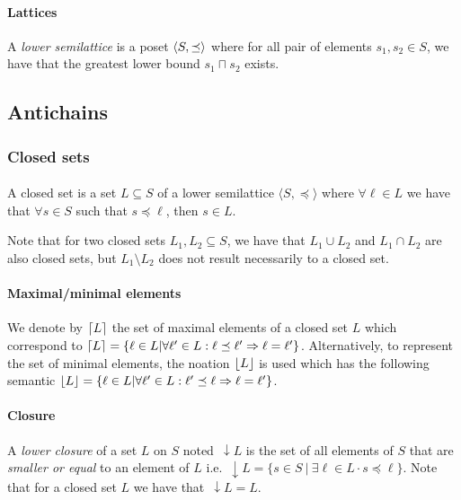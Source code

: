 \documentclass[letterpaper]{article}
\DeclarePairedDelimiter{\ceil}{\lceil}{\rceil}
\DeclarePairedDelimiter{\floor}{\lfloor}{\rfloor}
\DeclarePairedDelimiter{\tuple}{\langle}{\rangle}
\newcommand{\darrow}{\, \downarrow \!\!}
\theoremstyle{definition}
\begin{document}
\paragraph{Lattices} A \textit{lower semilattice} is a poset
$\tuple{S, \preceq}$ where for all pair of elements $s_1, s_2 \in S$,
we have that the greatest lower bound $s_1 \sqcap s_2$ exists.

\subsection{Antichains}

\subsubsection{Closed sets}

\paragraph{}


A closed set is a set $L \subseteq S$
of a lower semilattice $\langle S, \preceq \rangle$
where $\forall \ell \in L$ we have that $\forall s \in S$ such that
$s \preceq \ell$, then $s \in L$.

Note that for two closed sets $L_1, L_2 \subseteq S$, we have that
$L_1 \cup L_2$ and $L_1 \cap L_2$ are also closed sets,
but $L_1 \setminus L_2$ does not result necessarily to a closed set.

\paragraph{Maximal/minimal elements} We denote by $\ceil{L}$
the set of maximal elements of a closed set $L$ which
correspond to $\ceil{L} =
\{ \ell \in L | \forall \ell' \in L : \ell \preceq \ell'
 \Rightarrow \ell = \ell' \}$. Alternatively, to represent the set of minimal
 elements, the noation $\floor{L}$ is used which has the following semantic
$\floor{L} = \{ \ell \in L | \forall \ell' \in L :  \ell' \preceq \ell
 \Rightarrow \ell = \ell' \}$.


\paragraph{Closure} A \textit{lower closure} of a set $L$ on $S$
noted $\darrow L$ is the set of all elements of $S$ that are
\textit{smaller or equal} to an element of $L$ i.e.
$\darrow L = \{ s \in S \ | \ \exists \ell \in L \cdot s \preceq \ell\}$.
Note that for a closed set $L$ we have that $\darrow L = L$.
\end{document}
